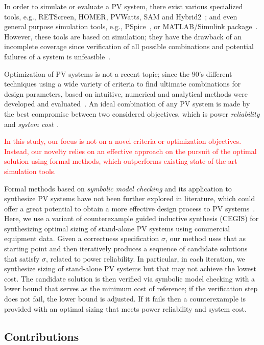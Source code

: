 \documentclass[review]{elsarticle}
\begin{document}
In order to simulate or evaluate a PV system, there exist various specialized tools, e.g., RETScreen, HOMER, PVWatts, SAM and  Hybrid2~\cite{Pradhan,Swarnkar,NRELDobos,NRELBlair,Mills}; and even general purpose simulation tools, e.g.,  PSpice~\cite{Gow1999}, or MATLAB/Simulink package~\cite{Benatiallah2017}. However, these tools are based on simulation; they have the drawback of an incomplete coverage  since verification of all possible combinations and potential failures of a system is unfeasible~\cite{ClarkeHV18}. 

Optimization of PV systems is not a recent topic; since the $90$'s different techniques using a wide variety of criteria to find ultimate combinations for design parameters, based on intuitive, numerical and analytical methods were developed and evaluated~\cite{Applasamy2011}. An ideal combination of any PV system is made by the best compromise between two considered objectives, which is power \textit{reliability} and \textit{system cost}~\cite{Alsadi2018}.
 
\textcolor{red}{In this study, our focus is not on a novel criteria or optimization objectives. Instead, our novelty relies on an effective approach on the pursuit of the optimal solution using formal methods, which outperforms existing state-of-the-art simulation tools.}

Formal methods based on \textit{symbolic model checking} and its application 
to synthesize PV systems have not been further explored in literature, which could offer 
a great potential to obtain a more effective design process to PV systems~\cite{ClarkeHV18}. 
Here, we use a variant of counterexample guided inductive synthesis (CEGIS) for synthesizing 
optimal sizing of stand-alone PV systems using commercial equipment data. 
Given a correctness specification $\sigma$, our method uses that as starting point 
and then iteratively produces a sequence of candidate solutions that satisfy $\sigma$, 
related to power reliability. In particular, in each iteration, we synthesize sizing of 
stand-alone PV systems but that may not achieve the lowest cost. The candidate solution 
is then verified via symbolic model checking with a lower bound that serves as the minimum 
cost of reference; if the verification step does not fail, the lower bound is adjusted. 
If it fails then a counterexample is provided with an optimal sizing that meets 
power reliability and system cost.

\subsection{Contributions}
\end{document}
